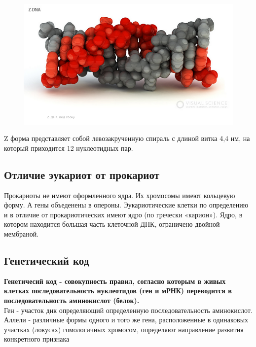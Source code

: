\documentclass[a4paper, 12pt]{article}
\begin{document}
	\begin{figure}[H]
		\includegraphics[scale=0.6]{2zdnk}
	\end{figure} 
Z форма представляет собой левозакрученную спираль с длиной витка 4,4 нм, на который приходится 12 нуклеотидных пар.
		\subsection{Отличие эукариот от прокариот}
		Прокариоты не имеют оформленного ядра. Их хромосомы имеют кольцевую форму. А гены объеденены в опероны.
		Эукариотические клетки по определению и в отличие от прокариотических имеют ядро (по гречески «карион»). Ядро, в котором
		находится большая часть клеточной ДНК, ограничено двойной мембраной. 
	
	\subsection{Генетический код}
	\textbf{Генетичесий код - совокупность правил, согласно которым в живых клетках последовательность нуклеотидов (ген и мРНК) переводится в последовательность аминокислот (белок).}\\
	Ген - участок днк определяющий определенную последовательность аминокислот.\\
	Аллели - различные формы одного и того же гена, расположенные в одинаковых участках (локусах) гомологичных хромосом, определяют направление развития конкретного признака
	
\end{document}
